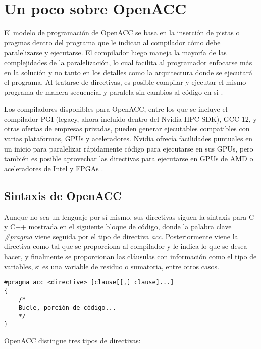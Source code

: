 \chapter{Un poco sobre OpenACC}
El modelo de programación de OpenACC se basa en la inserción de pistas o pragmas dentro del programa que le indican al compilador cómo debe paralelizarse y ejecutarse. El compilador luego maneja la mayoría de las complejidades de la paralelización, lo cual facilita al programador enfocarse más en la solución y no tanto en los detalles como la arquitectura donde se ejecutará el programa. Al tratarse de directivas, es posible compilar y ejecutar el mismo programa de manera secuencial y paralela sin cambios al código en si \cite{openacc_for_programmers}.

Los compiladores disponibles para OpenACC, entre los que se incluye el compilador PGI (legacy, ahora incluído dentro del Nvidia HPC SDK), GCC 12, y otras ofertas de empresas privadas, pueden generar ejecutables compatibles con varias plataformas, GPUs y aceleradores. Nvidia ofrecía facilidades puntuales en un inicio para paralelizar rápidamente código para ejecutarse en sus GPUs, pero también es posible aprovechar las directivas para ejecutarse en GPUs de AMD o aceleradores de Intel y FPGAs \cite{openacc_for_programmers}.

\section{Sintaxis de OpenACC}
Aunque no sea un lenguaje por sí mismo, sus directivas siguen la sintaxis para C y C++ mostrada en el siguiente bloque de código, donde la palabra clave \textit{\#pragma} viene seguida por el tipo de directiva \textit{acc}. Posteriormente viene la directiva como tal que se proporciona al compilador y le indica lo que se desea hacer, y finalmente se proporcionan las cláusulas con información como el tipo de variables, si es una variable de residuo o sumatoria, entre otros casos.

\begin{lstlisting}[style=CStyle]
#pragma acc <directive> [clause[[,] clause]...]
{
    /*
    Bucle, porción de código...
    */
}
\end{lstlisting}

OpenACC distingue tres tipos de directivas:

